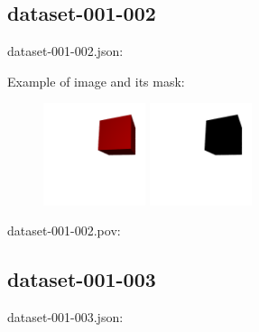 \subsection{dataset-001-002}

dataset-001-002.json:
\begin{scriptsize}
\begin{ttfamily}

\end{ttfamily}
\end{scriptsize}

Example of image and its mask:
\begin{center}
\begin{figure}[H]
\centering\includegraphics[width=3cm]{./img-001-002.png}
\centering\includegraphics[width=3cm]{./mask-001-002.png}
\end{figure}
\end{center}

dataset-001-002.pov:
\begin{scriptsize}
\begin{ttfamily}

\end{ttfamily}
\end{scriptsize}

\subsection{dataset-001-003}

dataset-001-003.json:
\begin{scriptsize}
\begin{ttfamily}

\end{ttfamily}
\end{scriptsize}

